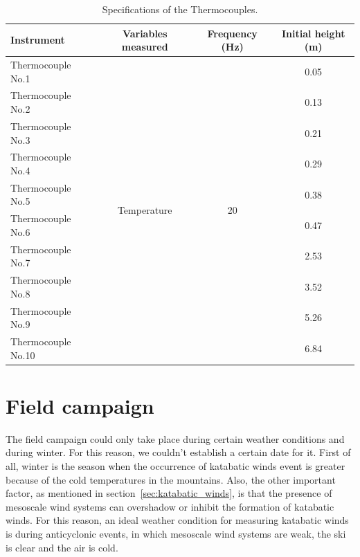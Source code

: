 \begin{table}[!ht]
    \centering
    \begin{tabular}{ | l | c | c | c |}
    \hline
    \textbf{Instrument} & \textbf{Variables measured} & \textbf{Frequency (Hz)} & \textbf{Initial height (m)} \\ [0.5ex]  \hline\hline
    Thermocouple No.1 & \multirow{10}{*}{Temperature} & \multirow{10}{*}{20} &  0.05\\
    Thermocouple No.2 & &  &  0.13\\
    Thermocouple No.3 & &  &  0.21\\
    Thermocouple No.4 &  &  &  0.29\\
    Thermocouple No.5 & &  &  0.38\\
    Thermocouple No.6 &  &  &  0.47\\
    Thermocouple No.7 & &  &  2.53\\
    Thermocouple No.8 &  &  &  3.52\\
    Thermocouple No.9 &  &  &  5.26\\
    Thermocouple No.10 &  &  & 6.84 \\
    \hline
    
    \end{tabular}
    \caption{Specifications of the Thermocouples.}
    \label{tab:intruments_thermocouples}
\end{table}


\section{Field campaign}

The field campaign could only take place during certain weather conditions and during winter. For this reason, we couldn't establish a certain date for it. First of all, winter is the season when the occurrence of katabatic winds event is greater because of the cold temperatures in the mountains. Also, the other important factor, as mentioned in section~\ref{sec:katabatic_winds}, is that the presence of mesoscale wind systems can overshadow or inhibit the formation of katabatic winds. For this reason, an ideal weather condition for measuring katabatic winds is during anticyclonic events, in which mesoscale wind systems are weak, the ski is clear and the air is cold.


